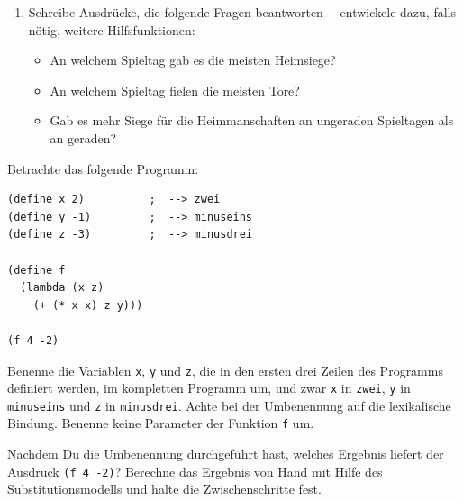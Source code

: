 \begin{aufgabe}
\begin{enumerate}
  \item Schreibe Ausdrücke, die folgende Fragen beantworten~--
  entwickele dazu, falls nötig, weitere Hilfsfunktionen:
  \begin{itemize}
    \item An welchem Spieltag gab es die meisten Heimsiege?
    \item An welchem Spieltag fielen die meisten Tore?
    \item Gab es mehr Siege für die Heimmanschaften an ungeraden Spieltagen als an
      geraden?
    \end{itemize}
\end{enumerate} 

\end{aufgabe}

\begin{aufgabe}

  Betrachte das folgende Programm:

\begin{lstlisting}
(define x 2)          ;  --> zwei
(define y -1)         ;  --> minuseins
(define z -3)         ;  --> minusdrei

(define f 
  (lambda (x z)
    (+ (* x x) z y)))

(f 4 -2)
\end{lstlisting}
  Benenne die Variablen \lstinline{x}, \lstinline{y} und \lstinline{z}, die in
  den ersten drei Zeilen des Programms definiert werden, im kompletten
  Programm um, und zwar \lstinline{x} in \lstinline{zwei}, \lstinline{y} in
  \lstinline{minuseins} und \lstinline{z} in \lstinline{minusdrei}. Achte bei
  der Umbenennung auf die lexikalische Bindung.  Benenne keine
  Parameter der Funktion \lstinline{f} um.

  Nachdem Du die Umbenennung durchgeführt hast, welches Ergebnis liefert
  der Ausdruck \lstinline{(f 4 -2)}? Berechne das Ergebnis von Hand mit Hilfe
  des Substitutionsmodells und halte die Zwischenschritte fest.
\end{aufgabe}

